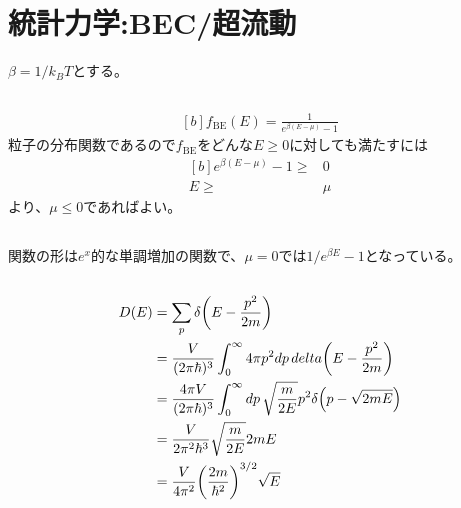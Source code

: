 \documentclass[../ap_2013.tex]{subfiles}
\begin{document}
\setcounter{chapter}{1}
\chapter{統計力学:BEC/超流動}
\(\beta=1/k_BT\)とする。
\section{}
\begin{equation}\begin{aligned}[b]
    f_\text{BE}(E)=\frac{1}{e^{\beta(E-\mu)}-1}
\end{aligned}\end{equation}
粒子の分布関数であるので\(f_\text{BE}\)をどんな\(E\geq0\)に対しても満たすには
\begin{equation}\begin{aligned}[b]
    e^{\beta(E-\mu)}-1 \geq& 0\\
    E\geq &\mu
\end{aligned}\end{equation}
より、\(\mu \leq 0\)であればよい。

\section{}
関数の形は\(e^x\)的な単調増加の関数で、\(\mu=0\)では\(1/e^{\beta E}-1\)となっている。

\section{}
\begin{equation}\begin{aligned}[b]
    D(E) &= \sum_p \delta\qty(E-\frac{p^2}{2m})\\
    &=\frac{V}{(2\pi\hbar)^3}\int_0^\infty 4\pi p^2dp\,delta\qty(E-\frac{p^2}{2m})\\
    &=\frac{4\pi V}{(2\pi\hbar)^3} \int_{0}^{\infty} dp\,\sqrt{\frac{m}{2E}}p^2\delta\qty(p-\sqrt{2mE})\\
    &=\frac{V}{2\pi^2\hbar^3}\sqrt{\frac{m}{2E}} 2mE\\
    &=\frac{V}{4\pi^2}\qty(\frac{2m}{\hbar^2})^{3/2}\sqrt{E}
\end{aligned}\end{equation}
\end{document}
